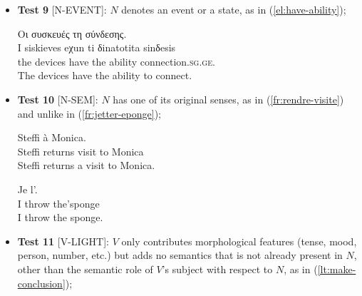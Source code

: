 \documentclass[output=paper,
modfonts,
]{langscibook}
\begin{document}
\begin{itemize}
\item[] \textbf{Test 9} [N-EVENT]: $N$ denotes an event or a state, as in (\ref{el:have-ability}); %

\ea \label{el:have-ability}
\settowidth {}
\glll Οι συσκευές  τη \underline{} σύνδεσης.\\
I siskieves eχun ti δinatotita sinδesis \\
the devices have the ability connection.\textsc{sg.ge}.\\ 
\glt The devices have the ability to connect. 
\z

\item[] \textbf{Test 10} [N-SEM]: $N$ has one of its original senses, as in (\ref{fr:rendre-visite}) and unlike in (\ref{fr:jetter-eponge});

\ea \label{fr:rendre-visite}
\settowidth {}
\gll Steffi   à Monica. \\
Steffi returns visit to Monica\\ 
\glt Steffi returns a visit to Monica. 
\z

\ea \label{fr:jetter-eponge}
\settowidth {}
\gll Je  l'. \\
I throw the'sponge\\  
\glt I throw the sponge. 
\z

\item[] \textbf{Test 11} [V-LIGHT]: $V$ only contributes morphological features (tense, mo\-od, person, number, etc.) but 
adds no semantics that is not already present in $N$, other than the semantic role of $V$'s subject with respect to $N$, as in (\ref{lt:make-conclusion});



\end{itemize}
\end{document}
